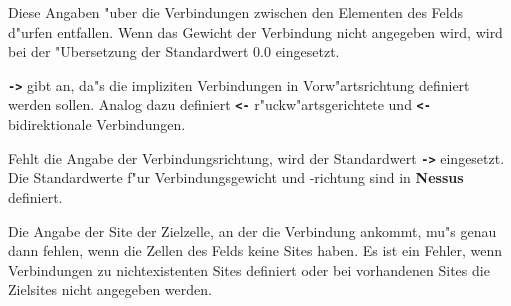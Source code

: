\begin{center}
\end{center}

Diese Angaben "uber die Verbindungen zwischen den Elementen des Felds
d"urfen entfallen. Wenn das Gewicht der Verbindung nicht angegeben
wird, wird bei der "Ubersetzung der Standardwert 0.0 eingesetzt.

{\bf \verb&->&} gibt an, da"s die impliziten Verbindungen in
Vorw"artsrichtung definiert werden sollen. Analog dazu definiert {\bf
\verb&<-&} r"uckw"artsgerichtete und {\bf \verb&<-&} bidirektionale
Verbindungen.

Fehlt die Angabe der Verbindungsrichtung, wird der
Standardwert {\bf \verb&->&} eingesetzt. Die Standardwerte f"ur
Verbindungsgewicht und -richtung sind in {\bf Nessus} definiert.

Die Angabe der Site der Zielzelle, an der die Verbindung
ankommt, mu"s genau dann fehlen, wenn die Zellen des Felds keine
Sites haben. Es ist ein Fehler, wenn Verbindungen zu
nichtexistenten Sites definiert oder bei vorhandenen
Sites die Zielsites nicht angegeben werden.
 

